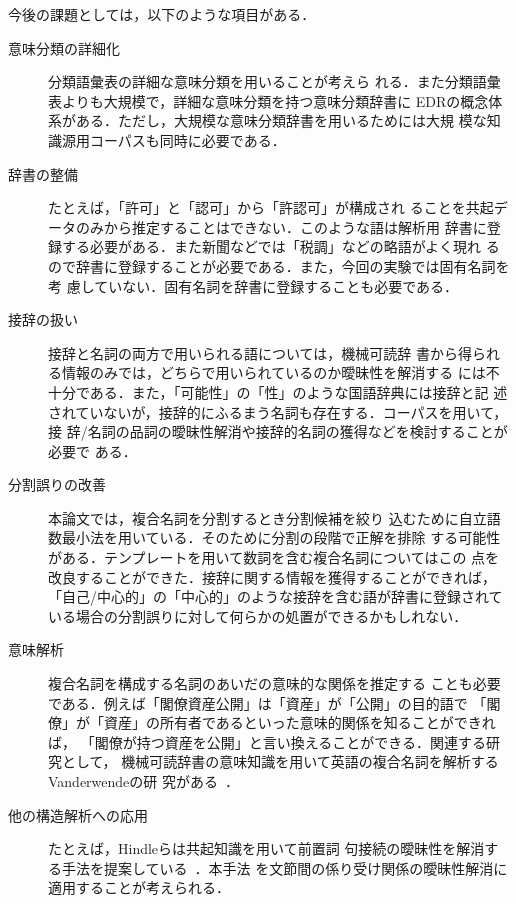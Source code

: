今後の課題としては，以下のような項目がある．
\begin{description}

\item[意味分類の詳細化] 分類語彙表の詳細な意味分類を用いることが考えら
れる．また分類語彙表よりも大規模で，詳細な意味分類を持つ意味分類辞書に
EDRの概念体系がある．ただし，大規模な意味分類辞書を用いるためには大規
模な知識源用コーパスも同時に必要である．

\item[辞書の整備]たとえば，「許可」と「認可」から「許認可」が構成され 
ることを共起データのみから推定することはできない．このような語は解析用
辞書に登録する必要がある．また新聞などでは「税調」などの略語がよく現れ
るので辞書に登録することが必要である．また，今回の実験では固有名詞を考
慮していない．固有名詞を辞書に登録することも必要である．

\item[接辞の扱い]接辞と名詞の両方で用いられる語については，機械可読辞
書から得られる情報のみでは，どちらで用いられているのか曖昧性を解消する
には不十分である．また，「可能性」の「性」のような国語辞典には接辞と記
述されていないが，接辞的にふるまう名詞も存在する．コーパスを用いて，接
辞/名詞の品詞の曖昧性解消や接辞的名詞の獲得などを検討することが必要で
ある．
  
\item[分割誤りの改善] 本論文では，複合名詞を分割するとき分割候補を絞り
込むために自立語数最小法を用いている．そのために分割の段階で正解を排除
する可能性がある．テンプレートを用いて数詞を含む複合名詞についてはこの
点を改良することができた．接辞に関する情報を獲得することができれば，
「自己/中心的」の「中心的」のような接辞を含む語が辞書に登録されて
いる場合の分割誤りに対して何らかの処置ができるかもしれない．

\item[意味解析] 複合名詞を構成する名詞のあいだの意味的な関係を推定する
ことも必要である．例えば「閣僚資産公開」は「資産」が「公開」の目的語で
「閣僚」が「資産」の所有者であるといった意味的関係を知ることができれば，
「閣僚が持つ資産を公開」と言い換えることができる．関連する研究として，
機械可読辞書の意味知識を用いて英語の複合名詞を解析するVanderwendeの研
究がある~\cite{vanderwende:94:a}．
  
\item[他の構造解析への応用]たとえば，Hindleらは共起知識を用いて前置詞 
句接続の曖昧性を解消する手法を提案している~\cite{hindle:91:a}．本手法
を文節間の係り受け関係の曖昧性解消に適用することが考えられる．
\end{description}


